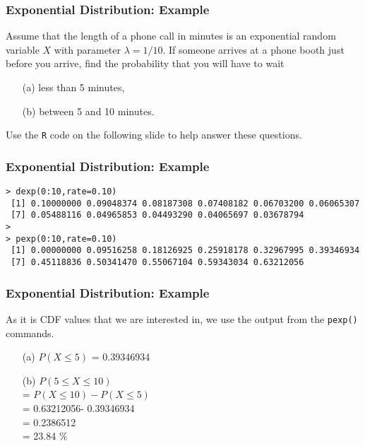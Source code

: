 \documentclass[a4]{beamer}
\begin{document}
\begin{frame}[fragile]
\frametitle{Exponential Distribution: Example}
Assume that the length of a phone call in minutes is an exponential random variable $X$ with parameter
$\lambda = 1/10$. If someone arrives at a phone booth just before you arrive, find the probability that you
will have to wait \begin{itemize}
\item[(a)] less than 5 minutes,  
\item[(b)] between 5 and 10 minutes.
\end{itemize}
Use the \texttt{R} code on the following slide to help answer these questions.
\end{frame}



\begin{frame}[fragile]
\frametitle{Exponential Distribution: Example}
\begin{verbatim}
> dexp(0:10,rate=0.10)
 [1] 0.10000000 0.09048374 0.08187308 0.07408182 0.06703200 0.06065307
 [7] 0.05488116 0.04965853 0.04493290 0.04065697 0.03678794
>
> pexp(0:10,rate=0.10)
 [1] 0.00000000 0.09516258 0.18126925 0.25918178 0.32967995 0.39346934
 [7] 0.45118836 0.50341470 0.55067104 0.59343034 0.63212056
\end{verbatim}
\end{frame}

\begin{frame}[fragile]
\frametitle{Exponential Distribution: Example}

As it is CDF values that we are interested in, we use the output from the \texttt{pexp()} commands.

\begin{itemize}
\item[(a)] $P(X \leq 5)$ = 0.39346934 
\item[(b)] $P(5 \leq X \leq 10)$ \\ = $P( X \leq 10) - P( X \leq 5)$ \\ = 0.63212056- 0.39346934 \\ = 0.2386512 \\= 23.84 $\%$
\end{itemize}

\end{frame}
\end{document}
